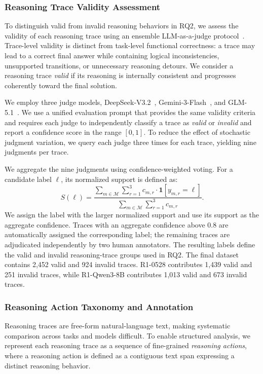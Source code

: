 \documentclass[acmsmall,screen,review,anonymous]{acmart}
\begin{document}
\subsubsection{\textbf{Reasoning Trace Validity Assessment}}
To distinguish valid from invalid reasoning behaviors in RQ2, we assess the validity of each reasoning trace using an ensemble LLM-as-a-judge protocol~\cite{llmjudge,customizedevaluator}. Trace-level validity is distinct from task-level functional correctness: a trace may lead to a correct final answer while containing logical inconsistencies, unsupported transitions, or unnecessary reasoning detours. We consider a reasoning trace \emph{valid} if its reasoning is internally consistent and progresses coherently toward the final solution.

We employ three judge models, DeepSeek-V3.2~\cite{deepseekv32}, Gemini-3-Flash~\cite{gemini3flash}, and GLM-5.1~\cite{glm51}. We use a unified evaluation prompt that provides the same validity criteria and requires each judge to independently classify a trace as \emph{valid} or \emph{invalid} and report a confidence score in the range \([0,1]\). To reduce the effect of stochastic judgment variation, we query each judge three times for each trace, yielding nine judgments per trace.

We aggregate the nine judgments using confidence-weighted voting. For a candidate label \(\ell\), its normalized support is defined as:
\begin{equation}
S(\ell)=
\frac{\sum_{m\in\mathcal{M}}\sum_{r=1}^{3} c_{m,r}\cdot \mathbf{1}[y_{m,r}=\ell]}
{\sum_{m\in\mathcal{M}}\sum_{r=1}^{3} c_{m,r}}.
\end{equation}
We assign the label with the larger normalized support and use its support as the aggregate confidence. Traces with an aggregate confidence above 0.8 are automatically assigned the corresponding label; the remaining traces are adjudicated independently by two human annotators. The resulting labels define the valid and invalid reasoning-trace groups used in RQ2. The final dataset contains 2{,}452 valid and 924 invalid traces. R1-0528 contributes 1{,}439 valid and 251 invalid traces, while R1-Qwen3-8B contributes 1{,}013 valid and 673 invalid traces.


\subsubsection{\textbf{Reasoning Action Taxonomy and Annotation}}
Reasoning traces are free-form natural-language text, making systematic comparison across tasks and models difficult. To enable structured analysis, we represent each reasoning trace as a sequence of fine-grained \textit{reasoning actions}, where a reasoning action is defined as a contiguous text span expressing a distinct reasoning behavior.
\end{document}
